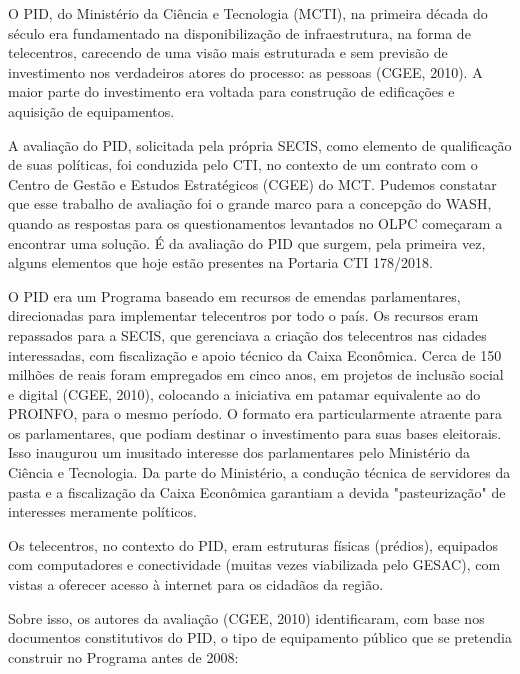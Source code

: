 O PID, do Ministério da Ciência e Tecnologia (MCTI), na primeira década do século era fundamentado na disponibilização de infraestrutura, na forma de telecentros, carecendo de uma visão mais estruturada e sem previsão de investimento nos verdadeiros atores do processo: as pessoas (CGEE, 2010). A maior parte do investimento era voltada para construção de edificações e aquisição de equipamentos.

A avaliação do PID, solicitada pela própria SECIS, como elemento de qualificação de suas políticas, foi conduzida pelo CTI, no contexto de um contrato com o Centro de Gestão e Estudos Estratégicos (CGEE) do MCT. Pudemos constatar que esse trabalho de avaliação foi o grande marco para a concepção do WASH, quando as respostas para os questionamentos levantados no OLPC começaram a encontrar uma solução. É da avaliação do PID que surgem, pela primeira vez, alguns elementos que hoje estão presentes na Portaria CTI 178/2018.

O PID era um Programa baseado em recursos de emendas parlamentares, direcionadas para implementar telecentros por todo o país. Os recursos eram repassados para a SECIS, que gerenciava a criação dos telecentros nas cidades interessadas, com fiscalização e apoio técnico da Caixa Econômica. Cerca de 150 milhões de reais foram empregados em cinco anos, em projetos de inclusão social e digital (CGEE, 2010), colocando a iniciativa em patamar equivalente ao do PROINFO, para o mesmo período. O formato era particularmente atraente para os parlamentares, que podiam destinar o investimento para suas bases eleitorais. Isso inaugurou um inusitado interesse dos parlamentares pelo Ministério da Ciência e Tecnologia. Da parte do Ministério, a condução técnica de servidores da pasta e a fiscalização da Caixa Econômica garantiam a devida "pasteurização" de interesses meramente políticos.

Os telecentros, no contexto do PID, eram estruturas físicas (prédios), equipados com computadores e conectividade (muitas vezes viabilizada pelo GESAC), com vistas a oferecer acesso à internet para os cidadãos da região.

Sobre isso, os autores da avaliação (CGEE, 2010) identificaram, com base nos documentos constitutivos do PID, o tipo de equipamento público que se pretendia construir no Programa antes de 2008:


\noindent\begin{center}\mbox{\centering{}}\end{center}



